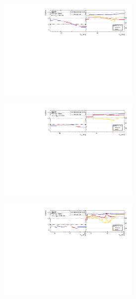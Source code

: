 \begin{figure}[htb]
    \centering 
    \begin{subfigure}{.99\textwidth}\centering
        \includegraphics[width = 0.75\textwidth]{Figures/m4l/UnfoldingStudies/v014_inputs/m34_m4l60-100inputs.pdf}
    \end{subfigure}
    \begin{subfigure}{.99\textwidth}\centering
        \includegraphics[width = 0.75\textwidth]{Figures/m4l/UnfoldingStudies/v014_inputs/m34_m4l120-130inputs.pdf}
    \end{subfigure}
    \begin{subfigure}{.99\textwidth}\centering
        \includegraphics[width = 0.75\textwidth]{Figures/m4l/UnfoldingStudies/v014_inputs/m34_m4l180-2000inputs.pdf}

\end{subfigure}
\end{figure}
